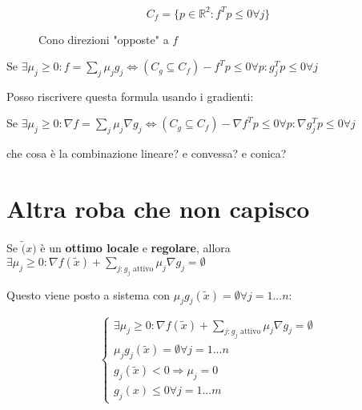 \documentclass[\main/main.tex]{subfiles}
\begin{document}
\begin{figure}[H]
\[
	C_f = \{ p \in \mathbb{R}^2: f^T p \leq 0 \forall j \} 
\]
\caption{Cono direzioni "opposte" a $f$}
\end{figure}

Se $\exists \mu_j \geq 0 : f = \sum_j \mu_j g_j \Leftrightarrow (C_g \subseteq C_f) -f^Tp \leq 0 \forall p: g_j^Tp \leq 0 \forall j$

Posso riscrivere questa formula usando i gradienti:

Se $\exists \mu_j \geq 0 : \nabla f = \sum_j \mu_j \nabla g_j \Leftrightarrow (C_g \subseteq C_f) -\nabla f^Tp \leq 0 \forall p: \nabla g_j^Tp \leq 0 \forall j$

che cosa è la combinazione lineare? e convessa? e conica?

\section{Altra roba che non capisco}

Se $\widetilde(x)$ è un \textbf{ottimo locale} e \textbf{regolare}, allora $\exists \mu_j \geq 0: \nabla f(\widetilde{x}) + \sum_{j:g_j \text{ attivo}} \mu_j \nabla g_j = \emptyset$

Questo viene posto a sistema con $\mu_j g_j (\widetilde{x}) = \emptyset \forall j = 1...n$:

\[
	\begin{cases}
		\exists \mu_j \geq 0: \nabla f(\widetilde{x}) + \sum_{j:g_j \text{ attivo}} \mu_j \nabla g_j = \emptyset\\
		\mu_j g_j (\widetilde{x}) = \emptyset \forall j = 1...n\\
		g_j(\widetilde{x}) <0 \Rightarrow \mu_j =0 \\
		g_j(x) \leq 0 \forall j = 1...m
	\end{cases}
\]
\end{document}
